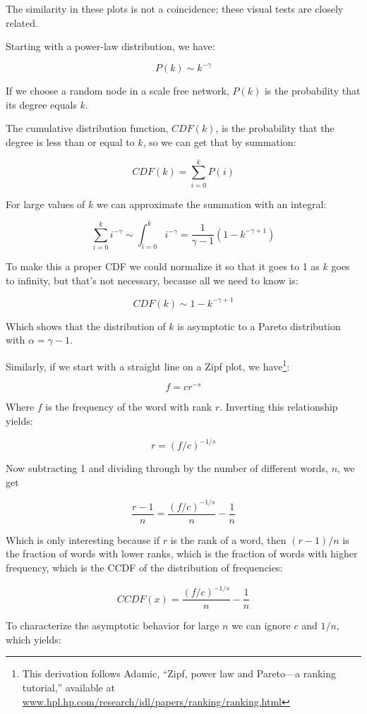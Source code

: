 \documentclass[10pt]{book}
\begin{document}
The similarity in these plots is not a coincidence; these
visual tests are closely related.

Starting with a power-law distribution, we have:

\[ P(k) \sim k^{- \gamma} \]

If we choose a random node in a scale free network,
$P(k)$ is the probability that its degree equals $k$.

The cumulative distribution function, $CDF(k)$, is the probability
that the degree is less than or equal to $k$, so we can
get that by summation:

\[ CDF(k) = \sum_{i=0}^k P(i) \]

For large values of $k$ we can approximate the summation with
an integral:

\[ \sum_{i=0}^k i^{- \gamma} \sim \int_{i=0}^k i^{- \gamma} =
\frac{1}{\gamma -1} (1 - k^{-\gamma + 1}) \]

To make this a proper CDF we could normalize it so that it
goes to 1 as $k$ goes to infinity, but that's not necessary,
because all we need to know is:

\[ CDF(k) \sim 1 - k^{-\gamma + 1} \]

Which shows that the distribution of $k$ is asymptotic to a
Pareto distribution with $\alpha = \gamma - 1$.

Similarly, if we start with a straight line on a Zipf plot,
we have\footnote{This derivation follows
Adamic, ``Zipf, power law and
Pareto---a ranking tutorial,'' available at
\url{www.hpl.hp.com/research/idl/papers/ranking/ranking.html}}:

\[ f = c r^{-s} \]

Where $f$ is the frequency of the word with rank $r$.  Inverting
this relationship yields:

\[ r = (f/c)^{-{1/s}} \]

Now subtracting 1 and dividing through by the number of different
words, $n$, we get

\[ \frac{r-1}{n} = \frac{(f/c)^{-{1/s}}}{n} - \frac{1}{n} \]

Which is only interesting because if $r$ is the rank of a word,
then $(r-1)/n$ is the fraction of words with lower ranks, which is
the fraction of words with higher frequency, which is the
CCDF of the distribution of frequencies:

\[ CCDF(x) = \frac{(f/c)^{-{1/s}}}{n} - \frac{1}{n} \]

To characterize the asymptotic behavior
for large $n$ we can ignore $c$ and $1/n$, which yields:
\end{document}
